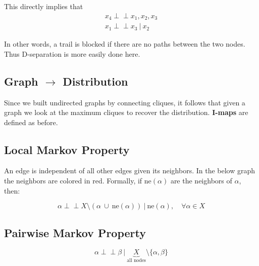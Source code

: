 \documentclass{article}
\newcommand{\giv}{\ |\ }
\newcommand\indep{\!\perp\!\!\!\perp}
\begin{document}
This directly implies that 
\begin{gather*}
    x_4 \indep x_1, x_2, x_3 \\
    x_1 \indep x_3 \giv x_2
\end{gather*}

In other words, a trail is blocked if there are no paths between the two nodes. Thus D-separation is more easily done here.

\subsection{Graph $\to$ Distribution}
Since we built undirected graphs by connecting cliques, it follows that given a graph we look at the maximum cliques to recover the distribution. \textbf{I-maps} are defined as before.

\subsection{Local Markov Property}
An edge is independent of all other edges given its neighbors. In the below graph the neighbors are colored in red. Formally, if $\text{ne}(\alpha)$ are the neighbors of $\alpha$, then:

$$
    \alpha \indep X \setminus (\alpha\ \cup\ \text{ne}(\alpha)) \giv \text{ne}(\alpha), \quad \forall \alpha \in X
$$


\begin{center}
\end{center}

\subsection{Pairwise Markov Property}
\begin{equation*}
    \alpha \indep \beta \giv \underbrace{X}_{\text{all nodes}} \setminus \{ \alpha, \beta \}
\end{equation*}
\end{document}
